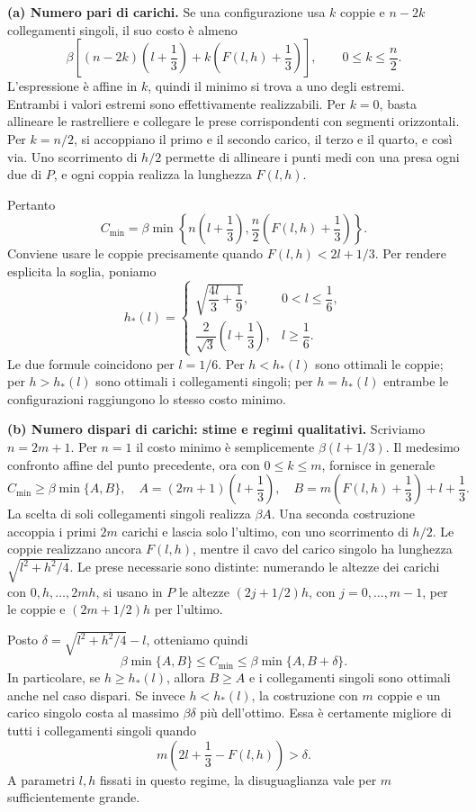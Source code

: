 {\textbf{(a) Numero pari di carichi.}
Se una configurazione usa $k$ coppie e $n-2k$ collegamenti singoli,
il suo costo \`e almeno
\[
\beta\left[
(n-2k)\left(l+\frac13\right)
+k\left(F(l,h)+\frac13\right)\right],
\qquad 0\le k\le\frac n2.
\]
L'espressione \`e affine in $k$, quindi il minimo si trova a uno degli estremi.
Entrambi i valori estremi sono effettivamente realizzabili.
Per $k=0$, basta allineare le rastrelliere e collegare le prese corrispondenti
con segmenti orizzontali. Per $k=n/2$, si accoppiano il primo e il secondo
carico, il terzo e il quarto, e cos\`i via. Uno scorrimento di $h/2$ permette
di allineare i punti medi con una presa ogni due di $P$, e ogni coppia
realizza la lunghezza $F(l,h)$.

Pertanto
\[
C_{\min}=\beta\min\left\{
n\left(l+\frac13\right),\frac n2\left(F(l,h)+\frac13\right)\right\}.
\]
Conviene usare le coppie precisamente quando $F(l,h)<2l+1/3$.
Per rendere esplicita la soglia, poniamo
\[
h_*(l)=
\begin{cases}
\sqrt{\dfrac{4l}{3}+\dfrac19},&0<l\le\dfrac16,\\[5pt]
\dfrac{2}{\sqrt3}\left(l+\dfrac13\right),&l\ge\dfrac16.
\end{cases}
\]
Le due formule coincidono per $l=1/6$.
Per $h<h_*(l)$ sono ottimali le coppie; per $h>h_*(l)$ sono ottimali
i collegamenti singoli; per $h=h_*(l)$ entrambe le configurazioni
raggiungono lo stesso costo minimo.

\textbf{(b) Numero dispari di carichi: stime e regimi qualitativi.}
Scriviamo $n=2m+1$. Per $n=1$ il costo minimo \`e semplicemente
$\beta(l+1/3)$. Il medesimo confronto affine del punto precedente,
ora con $0\le k\le m$, fornisce in generale
\[
C_{\min}\ge\beta\min\{A,B\},
\quad
A=(2m+1)\left(l+\frac13\right),
\quad
B=m\left(F(l,h)+\frac13\right)+l+\frac13.
\]
La scelta di soli collegamenti singoli realizza $\beta A$.
Una seconda costruzione accoppia i primi $2m$ carichi e lascia solo l'ultimo,
con uno scorrimento di $h/2$. Le coppie realizzano ancora $F(l,h)$,
mentre il cavo del carico singolo ha lunghezza $\sqrt{l^2+h^2/4}$.
Le prese necessarie sono distinte: numerando le altezze dei carichi con
$0,h,\ldots,2mh$, si usano in $P$ le altezze
$(2j+1/2)h$, con $j=0,\ldots,m-1$, per le coppie e $(2m+1/2)h$ per l'ultimo.

Posto $\delta=\sqrt{l^2+h^2/4}-l$, otteniamo quindi
\[
\beta\min\{A,B\}\le C_{\min}
\le\beta\min\{A,B+\delta\}.
\]
In particolare, se $h\ge h_*(l)$, allora $B\ge A$ e i collegamenti singoli
sono ottimali anche nel caso dispari.
Se invece $h<h_*(l)$, la costruzione con $m$ coppie e un carico singolo
costa al massimo $\beta\delta$ pi\`u dell'ottimo.
Essa \`e certamente migliore di tutti i collegamenti singoli quando
\[
m\left(2l+\frac13-F(l,h)\right)>\delta.
\]
A parametri $l,h$ fissati in questo regime, la disuguaglianza vale per
$m$ sufficientemente grande.

}
